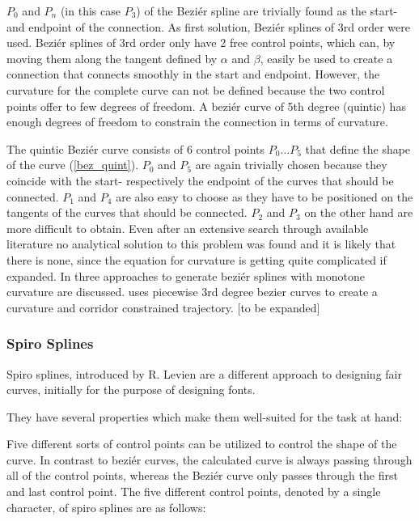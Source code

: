 $P_0$ and $P_n$ (in this case $P_3$) of the Beziér spline are trivially found as the start- and endpoint of the connection. As first solution,  Beziér splines of 3rd order were used. Beziér splines of 3rd order only have 2 free control points, which can, by moving them along the tangent defined by $\alpha$ and $\beta$, easily be used to create a connection that connects smoothly in the start and endpoint. However, the curvature for the complete curve can not be defined because the two control points offer to few degrees of freedom. A beziér curve of 5th degree (quintic) has enough degrees of freedom to constrain the connection in terms of curvature.

The quintic Beziér curve consists of 6 control points $P_0 \ldots P_5$ that define the shape of the curve (\autoref{bez_quint}). $P_0$ and $P_5$ are again trivially chosen because they coincide with the start- respectively the endpoint of the curves that should be connected. $P_1$ and $P_4$ are also easy to choose as they have to be positioned on the tangents of the curves that should be connected. $P_2$ and $P_3$ on the other hand are more difficult to obtain. Even after an extensive search through available literature no analytical solution to this problem was found and it is likely that there is none, since the equation for curvature is getting quite complicated if expanded. In \cite{doi:10.1137/1.9781611971521.ch5} three approaches to generate beziér splines with monotone curvature are discussed. \cite{choi2010piecewise} uses piecewise 3rd degree bezier curves to create a curvature and corridor constrained trajectory.  [to be expanded]

\subsubsection{Spiro Splines}

Spiro splines, introduced by R. Levien \cite{levien2009spiral} are a different approach to designing fair curves, initially for the purpose of designing fonts. 

They have several properties which make them well-suited for the task at hand:

Five different sorts of control points can be utilized to control the shape of the curve. In contrast to beziér curves, the calculated curve is always passing through all of the control points, whereas the Beziér curve only passes through the first and last control point. The five different control points, denoted by a single character, of spiro splines are as follows:

